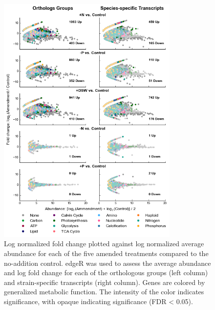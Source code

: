 
\begin{figure}[p!]
  \centering
    \includegraphics[width=0.8\textwidth]{Images/C6_FigureS4_MANTA.png}
    \caption[Log normalized fold change plotted against log normalized average abundance for each of the five amended treatments compared to the no-addition control]{Log normalized fold change plotted against log normalized average abundance for each of the five amended treatments compared to the no-addition control. edgeR was used to assess the average abundance and log fold change for each of the orthologous groups (left column) and strain-specific transcripts (right column). Genes are colored by generalized metabolic function. The intensity of the color indicates significance, with opaque indicating significance (FDR < 0.05). }
    \label{fig:a5f4}
\end{figure}



